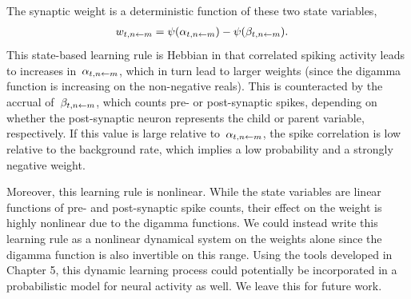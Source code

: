 The synaptic weight is a deterministic function of these two state variables,
\begin{align*}
  w_{t, n \leftarrow m} &= \psi(\alpha_{t, n \leftarrow m}) - \psi(\beta_{t, n \leftarrow m}).
\end{align*}
This state-based learning rule is Hebbian in that correlated spiking
activity leads to increases in~$\alpha_{t,n\leftarrow m}$, which in turn
lead to larger weights (since the digamma function is increasing on
the non-negative reals).
This is counteracted by the accrual of~$\beta_{t, n \leftarrow m}$, which
counts pre- or post-synaptic spikes, depending on whether the
post-synaptic neuron represents the child or parent variable, respectively.
If this value is large relative to~$\alpha_{t, n \leftarrow m}$, the
spike correlation is low relative to the background rate, which
implies a low probability and a strongly negative weight. 

Moreover, this learning rule is nonlinear. While the state variables
are linear functions of pre- and post-synaptic spike counts, their
effect on the weight is highly nonlinear due to the digamma functions.
We could instead write this learning rule as a nonlinear dynamical
system on the weights alone since the digamma function is also
invertible on this range. Using the tools developed in Chapter 5, this
dynamic learning process could potentially be incorporated in a
probabilistic model for neural activity as well.  We leave this for
future work.

